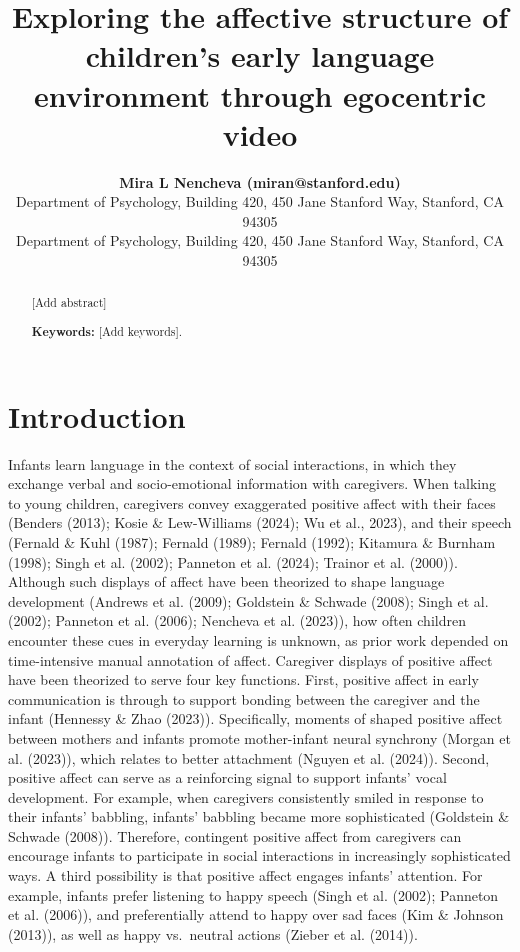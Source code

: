 \documentclass[10pt, letterpaper]{article}
\title{Exploring the affective structure of children's early language
environment through egocentric video}
\author{{\large \bf Mira L Nencheva (miran@stanford.edu)} \\ Department of Psychology, Building 420, 450 Jane Stanford Way, Stanford, CA 94305 \AND {\large \bf Michael C. Frank (mcfrank@stanford.edu)} \\ Department of Psychology, Building 420, 450 Jane Stanford Way, Stanford, CA 94305}
\begin{document}
\maketitle

\begin{abstract}
{[}Add abstract{]}

\textbf{Keywords:}
{[}Add keywords{]}.
\end{abstract}

\section{Introduction}\label{introduction}

Infants learn language in the context of social interactions, in which
they exchange verbal and socio-emotional information with caregivers.
When talking to young children, caregivers convey exaggerated positive
affect with their faces (Benders (2013); Kosie \& Lew-Williams (2024);
Wu et al., 2023), and their speech (Fernald \& Kuhl (1987); Fernald
(1989); Fernald (1992); Kitamura \& Burnham (1998); Singh et al. (2002);
Panneton et al. (2024); Trainor et al. (2000)). Although such displays
of affect have been theorized to shape language development (Andrews et
al. (2009); Goldstein \& Schwade (2008); Singh et al. (2002); Panneton
et al. (2006); Nencheva et al. (2023)), how often children encounter
these cues in everyday learning is unknown, as prior work depended on
time-intensive manual annotation of affect. Caregiver displays of
positive affect have been theorized to serve four key functions. First,
positive affect in early communication is through to support bonding
between the caregiver and the infant (Hennessy \& Zhao (2023)).
Specifically, moments of shaped positive affect between mothers and
infants promote mother-infant neural synchrony (Morgan et al. (2023)),
which relates to better attachment (Nguyen et al. (2024)). Second,
positive affect can serve as a reinforcing signal to support infants'
vocal development. For example, when caregivers consistently smiled in
response to their infants' babbling, infants' babbling became more
sophisticated (Goldstein \& Schwade (2008)). Therefore, contingent
positive affect from caregivers can encourage infants to participate in
social interactions in increasingly sophisticated ways. A third
possibility is that positive affect engages infants' attention. For
example, infants prefer listening to happy speech (Singh et al. (2002);
Panneton et al. (2006)), and preferentially attend to happy over sad
faces (Kim \& Johnson (2013)), as well as happy vs.~neutral actions
(Zieber et al. (2014)).
\end{document}
